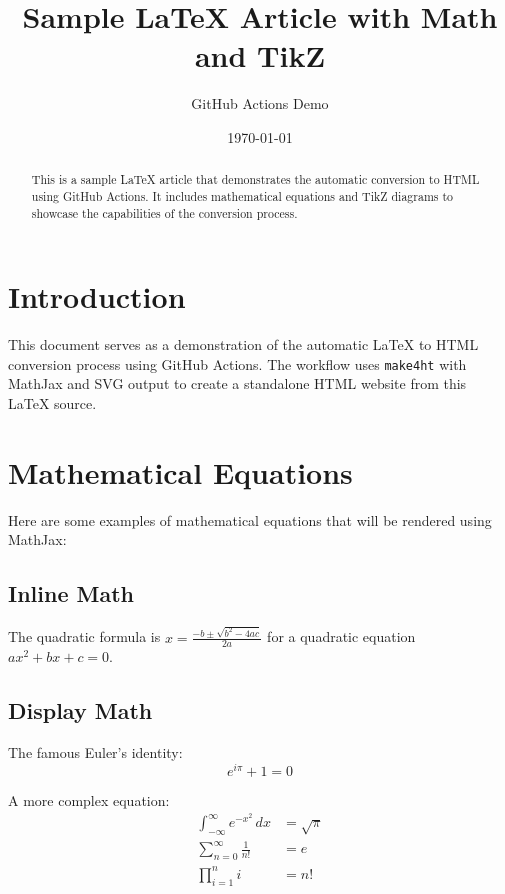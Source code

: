 \documentclass{article}
\title{Sample \LaTeX{} Article with Math and TikZ}
\author{GitHub Actions Demo}
\date{\today}
\begin{document}
\maketitle

\begin{abstract}
  This is a sample \LaTeX{} article that demonstrates the automatic conversion to HTML using GitHub Actions. It includes mathematical equations and TikZ diagrams to showcase the capabilities of the conversion process.
\end{abstract}

\section{Introduction}

This document serves as a demonstration of the automatic \LaTeX{} to HTML conversion process using GitHub Actions. The workflow uses \texttt{make4ht} with MathJax and SVG output to create a standalone HTML website from this \LaTeX{} source.

\section{Mathematical Equations}

Here are some examples of mathematical equations that will be rendered using MathJax:

\subsection{Inline Math}

The quadratic formula is $x = \frac{-b \pm \sqrt{b^2 - 4ac}}{2a}$ for a quadratic equation $ax^2 + bx + c = 0$.

\subsection{Display Math}

The famous Euler's identity:
\begin{equation}
  e^{i\pi} + 1 = 0
\end{equation}

A more complex equation:
\begin{align}
  \int_{-\infty}^{\infty} e^{-x^2} \, dx &= \sqrt{\pi} \\
  \sum_{n=0}^{\infty} \frac{1}{n!} &= e \\
  \prod_{i=1}^{n} i &= n!
\end{align}
\end{document}
